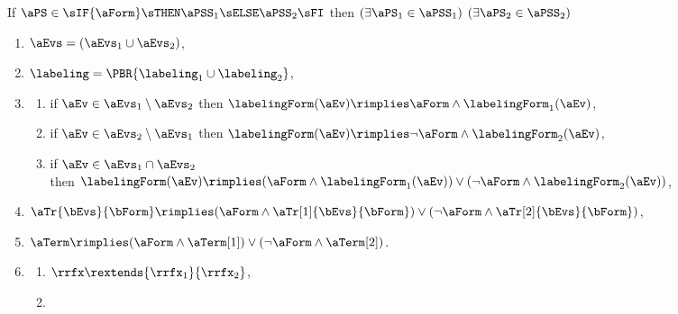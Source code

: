 \begin{figure}
  \noindent
  If $\aPS \in \sIF{\aForm}\sTHEN\aPSS_1\sELSE\aPSS_2\sFI$ then
  $(\exists\aPS_1\in\aPSS_1)$ $(\exists\aPS_2\in\aPSS_2)$
  \begin{multicols}{2}
    \begin{enumerate}[topsep=0pt,label=(\textsc{c}\arabic*),ref=\textsc{c}\arabic*]
    \item \label{if-E}
      $\aEvs = (\aEvs_1\cup\aEvs_2)$,
    \item \label{if-lambda}
      ${\labeling}=\PBR{{\labeling_1}\cup {\labeling_2}}$, 
    \item[] 
      \begin{enumerate}[leftmargin=0pt]
      \item \label{if-kappa1}
        if $\aEv\in\aEvs_1\setminus\aEvs_2$ then $\labelingForm(\aEv) \rimplies \aForm\land\labelingForm_1(\aEv)$,
      \item \label{if-kappa2}
        if $\aEv\in\aEvs_2\setminus\aEvs_1$ then $\labelingForm(\aEv) \rimplies \neg\aForm\land\labelingForm_2(\aEv)$, 
      \item \label{if-kappa12}
        if $\aEv\in\aEvs_1\cap\aEvs_2$\\ then
        $\labelingForm(\aEv) \rimplies (\aForm\land\labelingForm_1(\aEv))\lor(\neg\aForm\land\labelingForm_2(\aEv))$,
      \end{enumerate}
    \item \label{if-tau}
      $\aTr{\bEvs}{\bForm} \rimplies (\aForm\land\aTr[1]{\bEvs}{\bForm})\lor(\neg\aForm\land\aTr[2]{\bEvs}{\bForm})$,
    \item \label{if-term}
      $\aTerm \rimplies (\aForm\land\aTerm[1])\lor(\neg\aForm\land\aTerm[2])$.
    \item[] 
      \begin{enumerate}[leftmargin=0pt]
      \item \label{if-rf-extends}
        ${\rrfx}\rextends{\rrfx_1}{\rrfx_2}$,
      \item \label{if-le-subset}

\end{enumerate}
\end{enumerate}
\end{multicols}
\end{figure}
